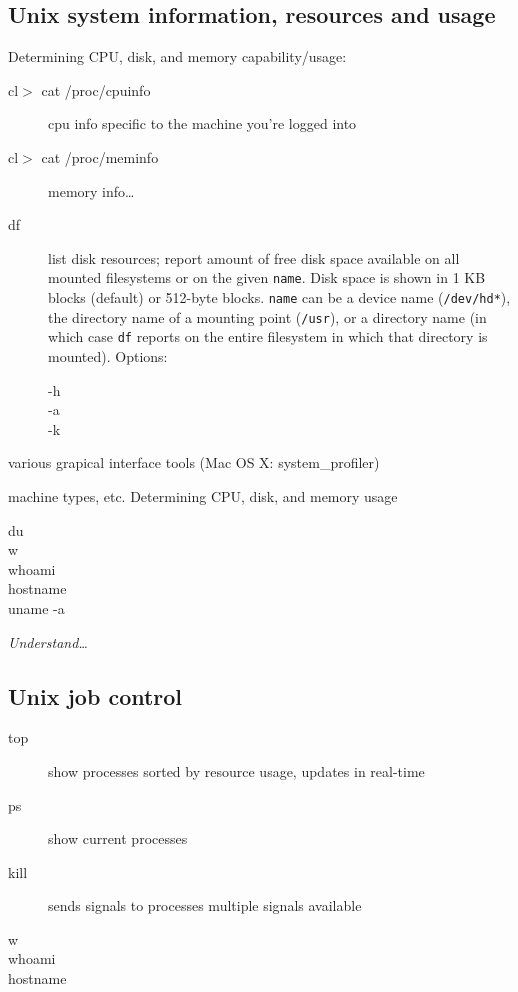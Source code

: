 \documentclass{article}
\newcommand{\test}[1]{%
    \begin{center}
        \colorbox{hl}{\parbox{0.9\textwidth}{\emph{\centering #1}}}
    \end{center}}
\begin{document}
\subsection{Unix system information, resources and usage}
Determining CPU, disk, and memory capability/usage:
\begin{description}
    \item [cl$>$ cat /proc/cpuinfo] cpu info specific to the machine you're
        logged into
    \item [cl$>$ cat /proc/meminfo] memory info\ldots
    \item [df] list disk resources; report amount of free disk space available
        on all mounted filesystems or on the given \texttt{name}. Disk space is shown in
        1 KB blocks (default) or 512-byte blocks. \texttt{name} can be a device
        name (\texttt{/dev/hd*}), the directory name of a mounting point
        (\texttt{/usr}), or a directory name (in which case \texttt{df} reports on
        the entire filesystem in which that directory is mounted). Options:
        \begin{description}
            \item [-h]
            \item [-a]
            \item [-k]
        \end{description}
\end{description}

various grapical interface tools (Mac OS X: system\_profiler)

machine types, etc.
Determining CPU, disk, and memory usage
\begin{description}
    \item [du]
    \item [w]
    \item [whoami]
    \item [hostname]
    \item [uname -a]
\end{description}

\test{Understand\ldots}

\subsection{Unix job control}
\begin{description}
    \item [top] show processes sorted by resource usage, updates in real-time
    \item [ps] show current processes
    \item [kill] sends signals to processes multiple signals available
    \item [w]
    \item [whoami]
    \item [hostname]
\end{description}
\end{document}
